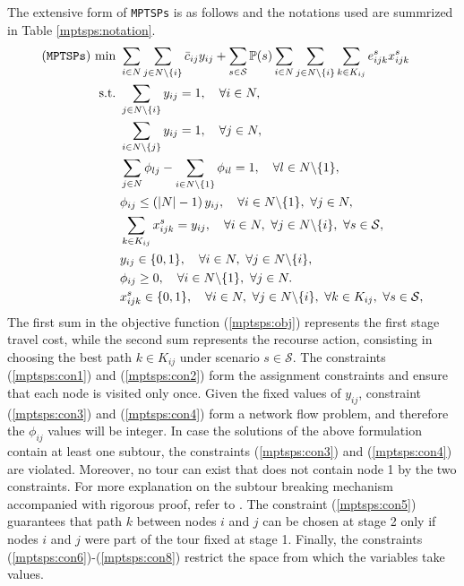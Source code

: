 The extensive form of \texttt{MPTSPs} is as follows and the notations used are summrized in Table \ref{mptsps:notation}.
\begin{subequations}
	\begin{align}
	(\texttt{MPTSPs})\ \textrm{min}\ &\sum_{i\in N}\sum_{j\in N\backslash\{i\}}\bar{c}_{ij}y_{ij}+\sum_{s\in \mathcal{S}}\PP(s)\sum_{i\in N}\sum_{j\in N\backslash\{i\}}\sum_{k\in K_{ij}}e_{ijk}^{s}x_{ijk}^{s} \label{mptsps:obj} \\ 
	\textrm{s.t.}\ &\sum_{j\in N\backslash\{i\}}y_{ij}=1,\quad\forall i\in N, \label{mptsps:con1} \\ 
	&\sum_{i\in N\backslash\{j\}}y_{ij}=1,\quad\forall j\in N,\label{mptsps:con2} \\ 
	&\sum_{j\in N}\phi_{lj}-\sum_{i\in N\backslash\{1\}}\phi_{il}=1,\quad\forall l\in N\backslash\{1\}, \label{mptsps:con3}  \\ 
	&\phi_{ij}\le \left(|N|-1\right)y_{ij},\quad\forall i\in N\backslash\{1\},\ \forall j\in N,  \label{mptsps:con4} \\ 
	&\sum_{k\in K_{ij}}x_{ijk}^{s}=y_{ij},\quad\forall i\in N,\ \forall j\in N\backslash\{i\},\ \forall s\in \mathcal{S}, \label{mptsps:con5} \\ 
	&y_{ij}\in \{0,1\},\quad \forall i\in N,\ \forall j\in N\backslash\{i\}, \label{mptsps:con6} \\ 
	&\phi_{ij} \ge 0, \quad \forall i\in N\backslash\{1\},\ \forall j\in N. \label{mptsps:con7} \\
	&x_{ijk}^{s}\in\{0,1\},\quad\forall i\in N,\ \forall j\in N\backslash\{i\},\ \forall k\in K_{ij},\ \forall s\in \mathcal{S}, \label{mptsps:con8} 
	\end{align}
\end{subequations}
The first sum in the objective function (\ref{mptsps:obj}) represents the first stage travel cost, while the second sum represents the recourse action, consisting in choosing the best path $k\in K_{ij}$ under scenario $s\in\mathcal{S}$. The constraints (\ref{mptsps:con1}) and (\ref{mptsps:con2}) form the assignment constraints and ensure that each node is visited only once. Given the fixed values of $y_{ij}$, constraint (\ref{mptsps:con3}) and (\ref{mptsps:con4}) form a network flow problem, and therefore the $\phi_{ij}$ values will be integer. In case the solutions of the above formulation contain at least one subtour, the constraints (\ref{mptsps:con3}) and (\ref{mptsps:con4}) are violated. Moreover, no tour can exist that does not contain node 1 by the two constraints. For more explanation on the subtour breaking mechanism accompanied with rigorous proof, refer to \cite{journal:GG1978}. The constraint (\ref{mptsps:con5}) guarantees that path $k$ between nodes $i$ and $j$ can be chosen at stage 2 only if nodes $i$ and $j$ were part of the tour fixed at stage 1. Finally, the constraints (\ref{mptsps:con6})-(\ref{mptsps:con8}) restrict the space from which the variables take values.


